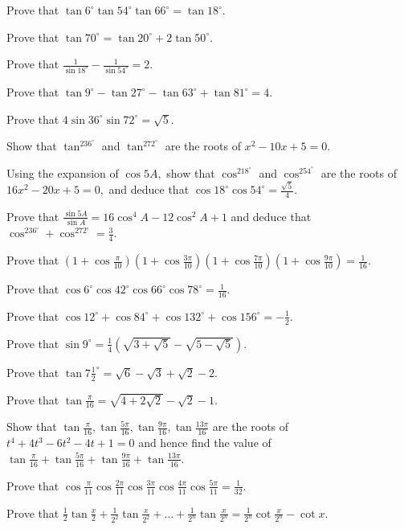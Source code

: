 \item Prove that $\tan6^\circ\tan54^\circ\tan66^\circ = \tan18^\circ$.
\item Prove that $\tan70^\circ = \tan20^\circ + 2\tan50^\circ$.
\item Prove that $\frac{1}{\sin18^\circ} - \frac{1}{\sin54^\circ} = 2$.
\item Prove that $\tan9^\circ - \tan27^\circ - \tan63^\circ + \tan81^\circ = 4$.
\item Prove that $4\sin36^\circ\sin72^\circ = \sqrt{5}$.
\item Show that $\tan^236^\circ$ and $\tan^272^\circ$ are the roots of $x^2 - 10x + 5 = 0$.
\item Using the expansion of $\cos5A,$ show that $\cos^218^\circ$ and $\cos^254^\circ$ are the roots of $16x^2 - 20x + 5 =
  0,$ and deduce that $\cos18^\circ\cos54^\circ = \frac{\sqrt{5}}{4}$.
\item Prove that $\frac{\sin5A}{\sin A} = 16\cos^4A - 12\cos^2A + 1$ and deduce that $\cos^236^\circ + \cos^272^\circ =
  \frac{3}{4}$.
\item Prove that $\left(1 + \cos\frac{\pi}{10}\right)\left(1 + \cos\frac{3\pi}{10}\right)\left(1 + \cos\frac{7\pi}{10}\right)\left(1
  + \cos\frac{9\pi}{10}\right) = \frac{1}{16}$.
\item Prove that $\cos6^\circ\cos42^\circ\cos66^\circ\cos78^\circ = \frac{1}{16}$.
\item Prove that $\cos12^\circ + \cos84^\circ + \cos132^\circ + \cos156^\circ = -\frac{1}{2}$.
\item Prove that $\sin9^\circ = \frac{1}{4}\left(\sqrt{3 + \sqrt{5}} - \sqrt{5 - \sqrt{5}}\right)$.
\item Prove that $\tan7\frac{1}{2}^\circ = \sqrt{6} - \sqrt{3} + \sqrt{2} - 2$.
\item Prove that $\tan\frac{\pi}{16} = \sqrt{4 + 2\sqrt{2}} - \sqrt{2} - 1$.
\item Show that $\tan\frac{\pi}{16}, \tan\frac{5\pi}{16}, \tan\frac{9\pi}{16}, \tan\frac{13\pi}{16}$ are the roots of $t^4 +
  4t^3 - 6t^2 - 4t + 1 = 0$ and hence find the value of $\tan\frac{\pi}{16} + \tan\frac{5\pi}{16} + \tan\frac{9\pi}{16} +
  \tan\frac{13\pi}{16}$.
\item Prove that $\cos\frac{\pi}{11}\cos\frac{2\pi}{11}\cos\frac{3\pi}{11}\cos\frac{4\pi}{11}\cos\frac{5\pi}{11} =
  \frac{1}{32}$.
\item Prove that $\frac{1}{2}\tan\frac{x}{2} + \frac{1}{2^2}\tan\frac{x}{2^2} + \ldots + \frac{1}{2^n}\tan\frac{x}{2^n} =
  \frac{1}{2^n}\cot\frac{x}{2^n} - \cot x$.
